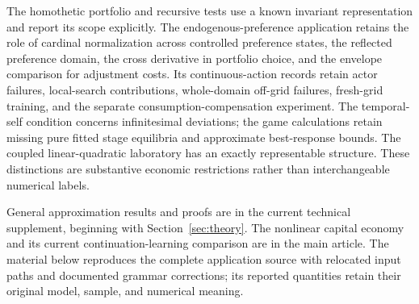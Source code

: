 The homothetic portfolio and recursive tests use a known invariant representation and report its scope explicitly. The endogenous-preference application retains the role of cardinal normalization across controlled preference states, the reflected preference domain, the cross derivative in portfolio choice, and the envelope comparison for adjustment costs. Its continuous-action records retain actor failures, local-search contributions, whole-domain off-grid failures, fresh-grid training, and the separate consumption-compensation experiment. The temporal-self condition concerns infinitesimal deviations; the game calculations retain missing pure fitted stage equilibria and approximate best-response bounds. The coupled linear-quadratic laboratory has an exactly representable structure. These distinctions are substantive economic restrictions rather than interchangeable numerical labels.

General approximation results and proofs are in the current technical supplement, beginning with Section~\ref{sec:theory}. The nonlinear capital economy and its current continuation-learning comparison are in the main article. The material below reproduces the complete application source with relocated input paths and documented grammar corrections; its reported quantities retain their original model, sample, and numerical meaning.
